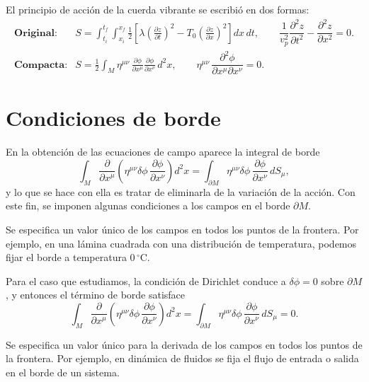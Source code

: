 \begin{observacion}[Resumen]
El principio de acción de la cuerda vibrante se escribió en dos formas:
\[
\begin{array}{ll}
\textbf{Original:} & S = \displaystyle\int_{t_i}^{t_f}\int_{x_i}^{x_f}
\frac12\left[\lambda\left(\frac{\partial z}{\partial t}\right)^2 -
T_0\left(\frac{\partial z}{\partial x}\right)^2\right] dx\,dt, \qquad
\dfrac{1}{v_p^2}\dfrac{\partial^2 z}{\partial t^2} - \dfrac{\partial^2
z}{\partial x^2} = 0. \\[10pt]
\textbf{Compacta:} & S = \displaystyle\frac12\int_M \eta^{\mu\nu}\,
\frac{\partial\phi}{\partial x^\mu}\frac{\partial\phi}{\partial x^\nu}\,
d^2x, \qquad \eta^{\mu\nu}\, \dfrac{\partial^2\phi}{\partial x^\mu
\partial x^\nu} = 0.
\end{array}
\]
\end{observacion}

\section{Condiciones de borde}

En la obtención de las ecuaciones de campo aparece la integral de borde
\[
\int_M \frac{\partial}{\partial x^\mu}\left(\eta^{\mu\nu}\delta\phi\,
\frac{\partial\phi}{\partial x^\nu}\right) d^2x = \int_{\partial M}
\eta^{\mu\nu}\delta\phi\, \frac{\partial\phi}{\partial x^\nu}\, dS_\mu,
\]
y lo que se hace con ella es tratar de eliminarla de la variación de la
acción. Con este fin, se imponen algunas condiciones a los campos en el
borde $\partial M$.

\begin{definicion}
Se especifica un valor único de los campos en todos los puntos de la
frontera. Por ejemplo, en una lámina cuadrada con una distribución de
temperatura, podemos fijar el borde a temperatura $0\,^\circ$C.
\end{definicion}

Para el caso que estudiamos, la condición de Dirichlet conduce a
$\delta\phi=0$ sobre $\partial M$, y entonces el término de borde
satisface
\[
\int_M \frac{\partial}{\partial x^\mu}\left(\eta^{\mu\nu}\delta\phi\,
\frac{\partial\phi}{\partial x^\nu}\right) d^2x = \int_{\partial M}
\eta^{\mu\nu}\delta\phi\, \frac{\partial\phi}{\partial x^\nu}\, dS_\mu =
0 .
\]

\begin{definicion}
Se especifica un valor único para la derivada de los campos en todos los
puntos de la frontera. Por ejemplo, en dinámica de fluidos se fija el
flujo de entrada o salida en el borde de un sistema.
\end{definicion}

